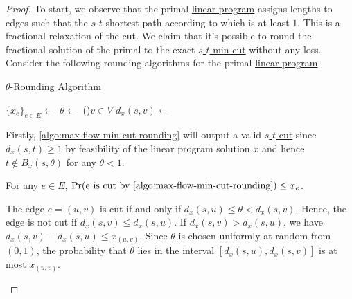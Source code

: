 \begin{proof}
	To start, we observe that the primal \hyperref[eq:s-t-min-cut-LP]{linear program} assigns lengths to edges such that the \(s\)-\(t\) shortest path according to which is at least \(1\). This is a fractional relaxation of the cut. We claim that it's possible to round the fractional solution of the primal to the exact \hyperref[prb:s-t-min-cut]{\(s\)-\(t\) min-cut} without any loss. Consider the following rounding algorithms for the primal \hyperref[eq:s-t-min-cut-LP]{linear program}.

	\begin{algorithm}[H]\label{algo:max-flow-min-cut-rounding}
		\DontPrintSemicolon{}
		\caption{\(\theta \)-Rounding Algorithm}

		\BlankLine

		\(\{ x_e \} _{e\in E} \gets\)
		\(\theta \gets\)\;
		\For(){\(v \in V\)}{
			\(d_x(s, v) \gets\)\;
		}
	\end{algorithm}

	Firstly, \autoref{algo:max-flow-min-cut-rounding} will output a valid \hyperref[prb:s-t-min-cut]{\(s\)-\(t\) cut} since \(d_x(s, t) \geq 1\) by feasibility of the linear program solution \(x\) and hence \(t \notin B_x(s, \theta )\) for any \(\theta < 1\).

	\begin{claim}
		For any \(e \in E\), \(\Pr(e \text{ is cut by \autoref{algo:max-flow-min-cut-rounding}} ) \leq x_e\).
	\end{claim}
	\begin{explanation}
		The edge \(e = (u, v)\) is cut if and only if \(d_x(s, u) \leq \theta < d_x(s, v)\). Hence, the edge is not cut if \(d_x(s, v) \leq d_x(s, u)\). If \(d_x(s, v) > d_x(s, u)\), we have \(d_x(s, v) - d_x(s, u) \leq x_{(u, v)}\). Since \(\theta \) is chosen uniformly at random from \((0, 1)\), the probability that \(\theta \) lies in the interval \([d_x(s, u), d_x(s, v)]\) is at most \(x_{(u, v)}\).
	\end{explanation}


\end{proof}
